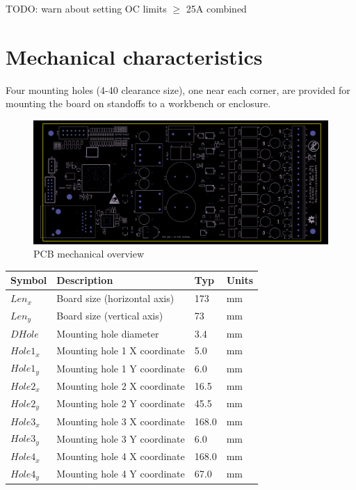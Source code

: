 \documentclass{article}
\begin{document}
TODO: warn about setting OC limits $\geq$ 25A combined

\pagebreak
\section{Mechanical characteristics}

Four mounting holes (4-40 clearance size), one near each corner, are provided for mounting the board on standoffs to a 
workbench or enclosure.

\begin{figure}[h]
\includegraphics[scale=0.19]{silk-front-small.png}
\caption{PCB mechanical overview}
\label{silk-front}
\end{figure}

\begin{longtable}{|l|p{2in}|p{0.5in}|p{0.5in}|}
\hline
{\bf Symbol} & {\bf Description} & {\bf Typ} & {\bf Units}\\
\hline
$Len_{x}$ & Board size (horizontal axis) & 173 & mm\\
\hline
$Len_{y}$ & Board size (vertical axis) & 73 & mm\\
\hline
$DHole$ & Mounting hole diameter & 3.4 & mm\\
\hline
$Hole1_{x}$ & Mounting hole 1 X coordinate & 5.0 & mm\\
$Hole1_{y}$ & Mounting hole 1 Y coordinate & 6.0 & mm\\
\hline
$Hole2_{x}$ & Mounting hole 2 X coordinate & 16.5 & mm\\
$Hole2_{y}$ & Mounting hole 2 Y coordinate & 45.5 & mm\\
\hline
$Hole3_{x}$ & Mounting hole 3 X coordinate & 168.0 & mm\\
$Hole3_{y}$ & Mounting hole 3 Y coordinate & 6.0 & mm\\
\hline
$Hole4_{x}$ & Mounting hole 4 X coordinate & 168.0 & mm\\
$Hole4_{y}$ & Mounting hole 4 Y coordinate & 67.0 & mm\\
\hline
\end{longtable}
\end{document}

